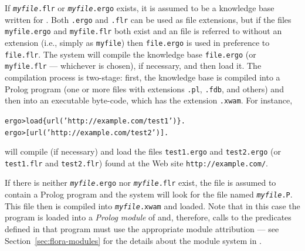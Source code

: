 \documentclass[11pt]{article}
\newcommand{\FLORA}{{\mbox{\smaller{\sc ${\cal F}${lora}\rm\emph{-2}}}}\xspace}
\newcommand{\ERGO}{\mbox{\smaller{\ensuremath{\cal{E}}\smaller{{\sc{RGO}}}}}\xspace}
\newcommand{\FLSYSTEM}{\ERGO}
\newcommand{\prompt}{ergo> }
\newcommand{\flrext}{flr\xspace}
\newcommand{\ergoext}{ergo\xspace}
\newcommand{\ignore}[1]{}
\newcommand{\ofile}{xwam}
\begin{document}
If \texttt{\textit{myfile}.\flrext} or \texttt{\textit{myfile}.\ergoext} exists, it is assumed to be a knowledge
base written for \FLSYSTEM.
Both \texttt{.\ergoext} and \texttt{.\flrext} can be used as \FLSYSTEM file
extensions, but if the files
\texttt{myfile.\ergoext} and \texttt{myfile.\flrext} both
exist and an \FLSYSTEM file is referred to without an extension (i.e.,
simply as \texttt{myfile}) then \texttt{file.\ergoext} is used in preference to
\texttt{file.\flrext}.  
The system will compile the knowledge base \texttt{file.\ergoext} (or
\texttt{myfile.\flrext} --- whichever is chosen), if necessary, and then load it. The
compilation process is two-stage: first, the knowledge base is compiled into a
Prolog program (one or more files with extensions {\tt .pl}, {\tt .fdb}, and
others)
and then into an executable byte-code, which has the extension {\tt .\ofile}.
For instance, 
\begin{alltt}
  \prompt load\{url('http://example.com/test1')\}.
  \prompt [url('http://example.com/test2')].
\end{alltt}
will compile (if necessary) and load the \FLSYSTEM files
{\tt test1.\ergoext} and
{\tt test2.\ergoext}
(or {\tt test1.\flrext} and
{\tt test2.\flrext})
found at the Web site {\tt http://example.com/}.   

If there is neither \texttt{\textit{myfile}.\ergoext} nor
\texttt{\textit{myfile}.\flrext} exist, the file is assumed to contain
a Prolog program and the system will look for the file named
\texttt{\textit{myfile}.P}. This file then is compiled into
\texttt{\textit{myfile}.\ofile} and
loaded. Note that in this case the program is loaded into a {\em Prolog
  module} of \FLSYSTEM and, therefore, calls to the predicates defined in that
program must use the appropriate module attribution --- see
Section~\ref{sec:flora-modules} for the details about the module system in
\FLSYSTEM.

\ignore{
However, if there are both
\texttt{program.ergo} and \texttt{program.flr} then \texttt{program.flr}
is ignored unless the \texttt{.flr} extension is \emph{explicitly}
mentioned. For instance, if the command \texttt{load\{'program.flr'\}}
is executed, then \texttt{program.flr} will be taken even if
\texttt{program.ergo} exists. On the other hand,
\texttt{load\{program\}} (without an explicit extension)
will try to load \texttt{program.ergo}
first. If this file does not exist, \texttt{program.flr} will be tried.
If that file is not found, \texttt{program.P} will be attempted followed by
\texttt{program.xwam}.
}
\end{document}
